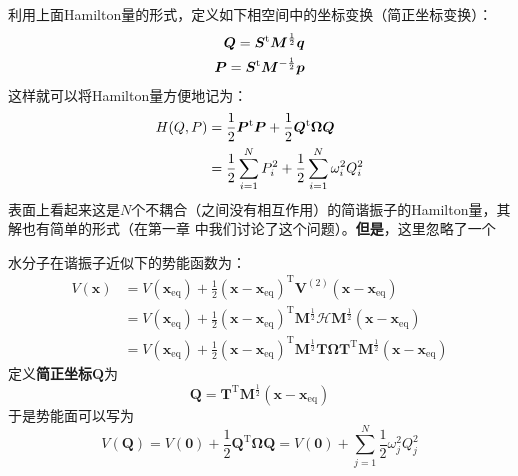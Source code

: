     利用上面Hamilton量的形式，定义如下相空间中的坐标变换（简正坐标变换）：
    \begin{equation}
        \begin{split}
            \bm{Q} = \bm{S}^{\mathrm{t}}\bm{M}^{\frac{1}{2}}\bm{q}\\
            \bm{P} = \bm{S}^{\mathrm{t}}\bm{M}^{-\frac{1}{2}}\bm{p}
        \end{split}
        \label{normal mode transformation}
    \end{equation}
    这样就可以将Hamilton量方便地记为：
    \begin{equation}
        \begin{split}
        H(Q,P) &= \frac{1}{2}\bm{P}^{\mathrm{t}}\bm{P} + \frac{1}{2}\bm{Q}^{\mathrm{t}}\bm{\Omega}\bm{Q}\\
        & = \frac{1}{2}\sum_{i=1}^{N}P_{i}^2 + \frac{1}{2}\sum_{i=1}^{N}\omega_{i}^2Q_{i}^{2}
        \end{split}
    \end{equation}
    表面上看起来这是$N$个不耦合（之间没有相互作用）的简谐振子的Hamilton量，其解也有简单的形式（在第一章
    中我们讨论了这个问题）。\textbf{但是}，这里忽略了一个

    水分子在谐振子近似下的势能函数为：
    \begin{align*}
        V(\bm{x}) &= V(\bm{x}_\mathrm{eq}) + \frac 12 (\bm{x-x}_\mathrm{eq})^\mathrm{T} \bm{V}^{(2)} (\bm{x-x}_\mathrm{eq})\\
        &= V(\bm{x}_\mathrm{eq}) + \frac 12 (\bm{x-x}_\mathrm{eq})^\mathrm{T} \bm{M}^{\frac 12}\bm{\mathcal{H}} \bm{M}^{\frac 12} (\bm{x-x}_\mathrm{eq})\\
        &= V(\bm{x}_\mathrm{eq}) + \frac 12 (\bm{x-x}_\mathrm{eq})^\mathrm{T} \bm{M}^{\frac 12} \bm{T\Omega T}^\mathrm{T} \bm{M}^{\frac 12} (\bm{x-x}_\mathrm{eq})
    \end{align*}
    定义\textbf{简正坐标}$\bm{Q}$为
    \begin{equation*}
        \bm{Q} = \bm{T}^\mathrm{T} \bm{M}^{\frac 12} (\bm{x-x}_\mathrm{eq})
    \end{equation*}
    于是势能面可以写为
    \begin{equation*}
        V(\bm{Q}) = V(\bm{0}) + \frac 12 \bm{Q}^\mathrm{T} \bm{\Omega Q} = V(\bm{0}) + \sum_{j=1}^N \frac 12 \omega_j^2 Q_j^2
    \end{equation*}

